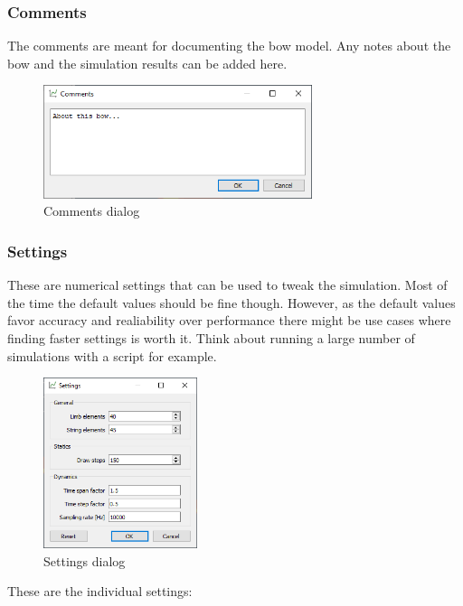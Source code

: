 \documentclass[12pt]{article}
\begin{document}
\newpage
\subsubsection{Comments}

The comments are meant for documenting the bow model. Any notes about the bow and the simulation results can be added here.

\begin{figure}[H]
\centering
\includegraphics[width=0.7\textwidth]{figures/screenshots/input/comments}
\caption{Comments dialog}
\label{fig:comments}
\end{figure}

\subsubsection{Settings}

These are numerical settings that can be used to tweak the simulation.
Most of the time the default values should be fine though.
However, as the default values favor accuracy and realiability over performance there might be use cases where finding faster settings is worth it.
Think about running a large number of simulations with a script for example.

\begin{figure}[H]
\centering
\includegraphics[width=0.4\textwidth]{figures/screenshots/input/settings}
\caption{Settings dialog}
\label{fig:settings}
\end{figure}

\newpage
These are the individual settings:
\end{document}
